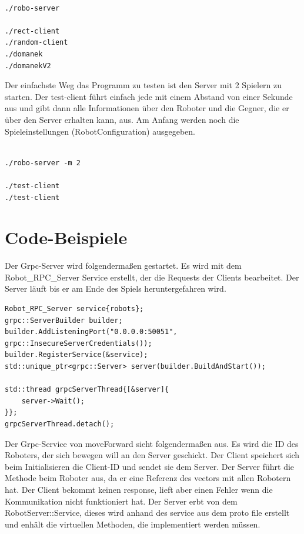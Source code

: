 \documentclass{article}
\begin{document}
\begin{lstlisting}

./robo-server

./rect-client
./random-client
./domanek
./domanekV2

\end{lstlisting}

Der einfachste Weg das Programm zu testen ist den Server mit 2 Spielern zu starten. Der test-client führt einfach jede mit einem Abstand von einer Sekunde aus und gibt dann alle Informationen über den Roboter und die Gegner, die er über den Server erhalten kann, aus. Am Anfang werden noch die Spieleinstellungen (RobotConfiguration) ausgegeben.

\begin{lstlisting}

./robo-server -m 2

./test-client
./test-client
\end{lstlisting}


\section{Code-Beispiele}
Der Grpc-Server wird folgendermaßen gestartet. Es wird mit dem Robot\_RPC\_Server Service erstellt, der die Requests der Clients bearbeitet. Der Server läuft bis er am Ende des Spiels heruntergefahren wird.

\begin{verbatim}
Robot_RPC_Server service{robots};
grpc::ServerBuilder builder;
builder.AddListeningPort("0.0.0.0:50051", grpc::InsecureServerCredentials());
builder.RegisterService(&service);
std::unique_ptr<grpc::Server> server(builder.BuildAndStart());

std::thread grpcServerThread{[&server]{
    server->Wait();
}};
grpcServerThread.detach();
\end{verbatim}

\vspace{1cm}

Der Grpc-Service von moveForward sieht folgendermaßen aus. Es wird die ID des Roboters, der sich bewegen will an den Server geschickt. Der Client speichert sich beim Initialisieren die Client-ID und sendet sie dem Server. Der Server führt die Methode beim Roboter aus, da er eine Referenz des vectors mit allen Robotern hat.
Der Client bekommt keinen response, lieft aber einen Fehler wenn die Kommunikation nicht funktioniert hat. Der Server erbt von dem RobotServer::Service, dieses wird anhand des service aus dem proto file erstellt und enhält die virtuellen Methoden, die implementiert werden müssen.
\end{document}
